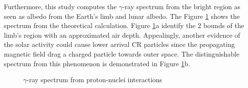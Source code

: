 Furthermore, this study computes the $\gamma$-ray spectrum from 
the bright region as seen as albedo from the Earth's limb and 
lunar albedo. The Figure \ref{fig:gamma_spectrum_earth_lunar} 
shows the spectrum from the theoretical calculation. Figure \ref{fig:gamma_spectrum_earth_lunar}a
identify the 2 bounds of the limb's region with an approximated air depth.
Appealingly, another evidence of the solar activity could cause lower arrival CR particles since the propagating magnetic field 
drag a charged particle towards outer space. The distinguishable
spectrum from this phenomenon is demonstrated in
Figure \ref{fig:gamma_spectrum_earth_lunar}b.


\begin{figure}[h!]
    \centering
        \hfill
        \caption{
            $\gamma$-ray spectrum from proton-nuclei interactions
            \citep{Morris84}
        }
       \label{fig:gamma_spectrum_earth_lunar}
\end{figure}


